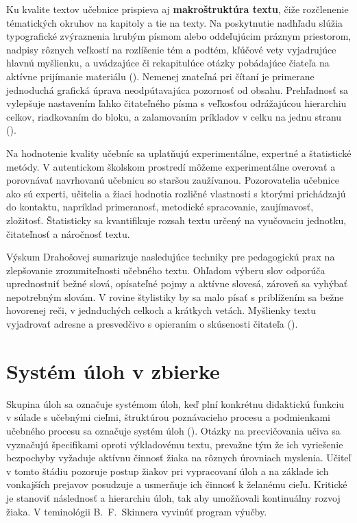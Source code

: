 Ku kvalite textov učebnice prispieva aj \textbf{makroštruktúra textu}, čiže rozčlenenie tématických okruhov na kapitoly a tie na texty. Na poskytnutie nadhľadu slúžia typografické zvýraznenia hrubým písmom alebo oddeľujúcim práznym priestorom, nadpisy rôznych veľkostí na rozlíšenie tém a podtém, kľúčové vety vyjadrujúce hlavnú myšlienku, a uvádzajúce či rekapitulúce otázky pobádajúce čiateľa na aktívne prijímanie materiálu (\cite{pavlovkin_ziak_1989}). Nemenej znateľná pri čítaní je primerane jednoduchá grafická úprava neodpútavajúca pozornosť od obsahu. Prehľadnosť sa vylepšuje nastavením ľahko čitateľného písma s veľkosťou odrážajúcou hierarchiu celkov, riadkovaním do bloku, a zalamovaním príkladov v celku na jednu stranu (\cite{mlady_tvorba_1988}).

Na hodnotenie kvality učebníc sa uplatňujú experimentálne, expertné a štatistické metódy. V autentickom školskom prostredí môžeme experimentálne overovať a porovnávať navrhovanú učebnicu so staršou zaužívanou. Pozorovatelia učebnice ako sú experti, učitelia a žiaci hodnotia rozličné vlastnosti s ktorými prichádzajú do kontaktu, napríklad primeranosť, metodické spracovanie, zaujímavosť, zložitosť. Štatisticky sa kvantifikuje rozsah textu určený na vyučovaciu jednotku, čitateľnosť a náročnosť textu.

Výskum Drahošovej sumarizuje nasledujúce techniky pre pedagogickú prax na zlepšovanie zrozumiteľnosti učebného textu. Ohľadom výberu slov odporúča uprednostniť bežné slová, opísateľné pojmy a aktívne slovesá, zároveň sa vyhýbať nepotrebným slovám. V rovine štylistiky by sa malo písať s priblížením sa bežne hovorenej reči, v jednduchých celkoch a krátkych vetách. Myšlienky textu vyjadrovať adresne a presvedčivo s opieraním o skúsenosti čitateľa (\cite{drahosova_hodnotenie_2014}).

\section{Systém úloh v zbierke}
Skupina úloh sa označuje systémom úloh, keď plní konkrétnu didaktickú funkciu v súlade s učebnými cieľmi, štruktúrou poznávacieho procesu a podmienkami učebného procesu sa označuje systém úloh (\cite{mindakova_tvorba_2008}). Otázky na precvičovania učiva sa vyznačujú špecifikami oproti výkladovému textu, prevažne tým že ich vyriešenie bezpochyby vyžaduje aktívnu činnosť žiaka na rôznych úrovniach myslenia. Učiteľ v tomto štádiu pozoruje postup žiakov pri vypracovaní úloh a na základe ich vonkajších prejavov posudzuje a usmerňuje ich činnosť k želanému cieľu. Kritické je stanoviť následnosť a hierarchiu úloh, tak aby umožňovali kontinuálny rozvoj žiaka. V teminológii B.~F.~Skinnera vyvinúť program výučby.   

